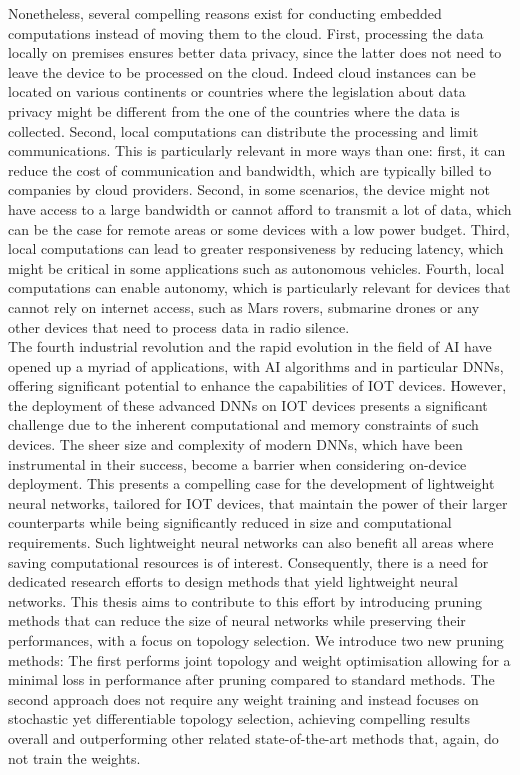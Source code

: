 Nonetheless, several compelling reasons exist for conducting embedded
computations instead of moving them to the cloud. First, processing the data
locally on premises ensures better data privacy, since the latter does not need
to leave the device to be processed on the cloud. Indeed cloud instances can be
located on various continents or countries where the legislation about data
privacy might be different from the one of the countries where the data is
collected. Second, local computations can distribute the processing and limit
communications. This is particularly relevant in more ways than one: first, it
can reduce the cost of communication and bandwidth, which are typically billed
to companies by cloud providers. Second, in some scenarios, the device might not
have access to a large bandwidth or cannot afford to transmit a lot of data,
which can be the case for remote areas or some devices with a low power budget.
Third, local computations can lead to greater responsiveness by reducing
latency, which might be critical in some applications such as autonomous
vehicles. Fourth, local computations can enable autonomy, which is particularly
relevant for devices that cannot rely on internet access, such as Mars rovers,
submarine drones or any other devices that need to process data in radio
silence.\\

The fourth industrial revolution and the rapid evolution in the field of \ac{AI}
have opened up a myriad of applications, with \ac{AI} algorithms and in
particular \acp{DNN}, offering significant potential to enhance the capabilities
of \ac{IOT} devices. However, the deployment of these advanced \acp{DNN} on
\ac{IOT} devices presents a significant challenge due to the inherent
computational and memory constraints of such devices. The sheer size and
complexity of modern \acp{DNN}, which have been instrumental in their success,
become a barrier when considering on-device deployment. This presents a
compelling case for the development of lightweight neural networks, tailored for
\ac{IOT} devices, that maintain the power of their larger counterparts while
being significantly reduced in size and computational requirements. Such
lightweight neural networks can also benefit all areas where saving
computational resources is of interest. Consequently, there is a need for
dedicated research efforts to design methods that yield lightweight neural
networks. This thesis aims to contribute to this effort by introducing pruning
methods that can reduce the size of neural networks while preserving their
performances, with a focus on topology selection. We introduce two new pruning
methods: The first performs joint topology and weight optimisation allowing for
a minimal loss in performance after pruning compared to standard methods. The
second approach does not require any weight training and instead focuses on
stochastic yet differentiable topology selection, achieving compelling results
overall and outperforming other related state-of-the-art methods that, again, do
not train the weights.

